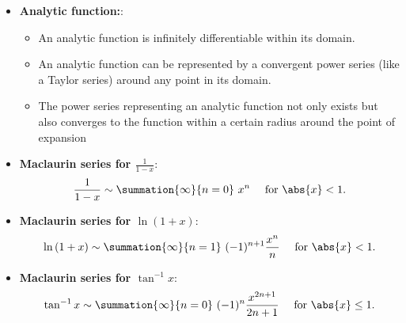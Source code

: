 \documentclass{report}
\begin{document}
\begin{itemize}
            \item \textbf{Analytic function:}: 
                \begin{itemize}
                    \item An analytic function is infinitely differentiable within its domain.
                    \item An analytic function can be represented by a convergent power series (like a Taylor series) around any point in its domain. 
                    \item  The power series representing an analytic function not only exists but also converges to the function within a certain radius around the point of expansion
                \end{itemize}
            \item \textbf{Maclaurin series for $\frac{1}{1-x}$}:
                \begin{align*}
                    \frac{1}{1-x} \sim \summation{\infty}{n=0}\ x^{n} \ \quad \text{for } \abs{x} < 1
                .\end{align*}
            \item \textbf{Maclaurin series for $\ln{(1+x)}$}:
                \begin{align*}
                    \ln{(1+x)} \sim \summation{\infty}{n=1}\ (-1)^{n+1}\frac{x^{n}}{n} \ \quad \text{for }\abs{x} < 1
                .\end{align*}
            \item \textbf{Maclaurin series for $\tan^{-1}{x}$}:
                \begin{align*}
                    \tan^{-1}{x} \sim \summation{\infty}{n=0}\ (-1)^{n}\frac{x^{2n+1}}{2n+1} \ \quad \text{for } \abs{x} \leq 1
                .\end{align*}


\end{itemize}
\end{document}
